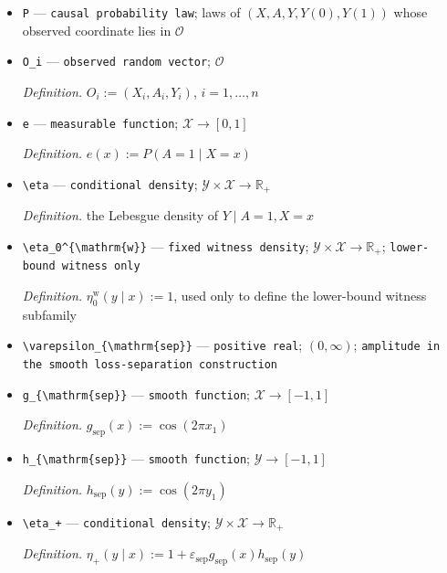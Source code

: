 \documentclass{article}
\begin{document}
\begin{itemize}
  \item \texttt{P} --- \texttt{causal probability law}; laws of \((X,A,Y,Y(0),Y(1))\) whose observed coordinate lies in \(\mathcal O\)
  \item \texttt{O\_\allowbreak{}i} --- \texttt{observed random vector}; \(\mathcal O\)
  \par\smallskip\noindent\emph{Definition.} \(O_i:=(X_i,A_i,Y_i)\), \(i=1,\ldots,n\)
  \item \texttt{e} --- \texttt{measurable function}; \(\mathcal X\to[0,1]\)
  \par\smallskip\noindent\emph{Definition.} \(e(x):=P(A=1\mid X=x)\)
  \item \texttt{\textbackslash{}\allowbreak{}eta} --- \texttt{conditional density}; \(\mathcal Y\times\mathcal X\to\mathbb R_+\)
  \par\smallskip\noindent\emph{Definition.} the Lebesgue density of \(Y\mid A=1,X=x\)
  \item \texttt{\textbackslash{}\allowbreak{}eta\_\allowbreak{}0\textasciicircum{}\{\textbackslash{}\allowbreak{}mathrm\{w\}\allowbreak{}\}\allowbreak{}} --- \texttt{fixed witness density}; \(\mathcal Y\times\mathcal X\to\mathbb R_+\); \texttt{lower-\allowbreak{}bound witness only}
  \par\smallskip\noindent\emph{Definition.} \(\eta_0^{\mathrm{w}}(y\mid x):=1\), used only to define the lower-bound witness subfamily
  \item \texttt{\textbackslash{}\allowbreak{}varepsilon\_\allowbreak{}\{\textbackslash{}\allowbreak{}mathrm\{sep\}\allowbreak{}\}\allowbreak{}} --- \texttt{positive real}; \((0,\infty)\); \texttt{amplitude in the smooth loss-\allowbreak{}separation construction}
  \item \texttt{g\_\allowbreak{}\{\textbackslash{}\allowbreak{}mathrm\{sep\}\allowbreak{}\}\allowbreak{}} --- \texttt{smooth function}; \(\mathcal X\to[-1,1]\)
  \par\smallskip\noindent\emph{Definition.} \(g_{\mathrm{sep}}(x):=\cos(2\pi x_1)\)
  \item \texttt{h\_\allowbreak{}\{\textbackslash{}\allowbreak{}mathrm\{sep\}\allowbreak{}\}\allowbreak{}} --- \texttt{smooth function}; \(\mathcal Y\to[-1,1]\)
  \par\smallskip\noindent\emph{Definition.} \(h_{\mathrm{sep}}(y):=\cos(2\pi y_1)\)
  \item \texttt{\textbackslash{}\allowbreak{}eta\_\allowbreak{}+\allowbreak{}} --- \texttt{conditional density}; \(\mathcal Y\times\mathcal X\to\mathbb R_+\)
  \par\smallskip\noindent\emph{Definition.} \(\eta_+(y\mid x):=1+\varepsilon_{\mathrm{sep}}g_{\mathrm{sep}}(x)h_{\mathrm{sep}}(y)\)

\end{itemize}
\end{document}
